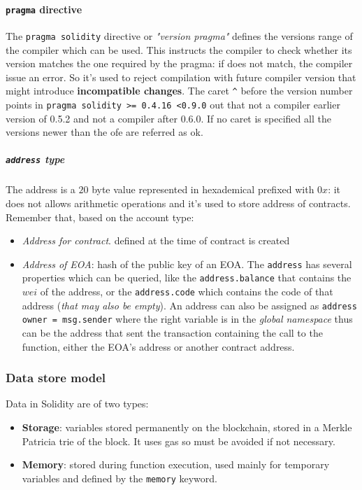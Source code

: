 \documentclass[10pt,a4paper]{report}
\begin{document}
\paragraph{\texttt{pragma} directive}\label{sec:pragma-directive}
The \texttt{pragma solidity} directive or \textit{"version pragma"} defines the versions range of the compiler which can be used. This instructs the compiler to check whether its version matches the one required by the pragma: if does not match, the compiler issue an error. So it's used to reject compilation with future compiler version that might introduce \textbf{incompatible changes}. The caret \texttt{\^} before the version number points in \texttt{pragma solidity >= 0.4.16 <0.9.0} out that not a compiler earlier version of 0.5.2 and not a compiler after 0.6.0. If no caret is specified all the versions newer than the ofe are referred as ok.
\subparagraph{\texttt{address} type}\label{sec:address-type}
The address is a $20$ byte value represented in hexademical prefixed with $0x$: it does not allows arithmetic operations and it's used to store address of contracts. Remember that, based on the account type:
\begin{itemize}
	\item 
	\textit{Address for contract}. defined at the time of contract is created
	\item 
	\textit{Address of EOA}: hash of the public key of an EOA.
	The \texttt{address} has several properties which can be queried, like the \texttt{address.balance} that contains the $wei$ of the address, or the \texttt{address.code} which contains the code of that address  (\textit{that may also be empty}).
	An address can also be assigned as \texttt{address owner = msg.sender} where the right variable is in the \textit{global namespace} thus can be the address that sent the transaction containing the call to the function, either the EOA's address or another contract address.
\end{itemize}
\subsubsection{Data store model}\label{sec:data-store-model}
Data in Solidity are of two types:
\begin{itemize}
	\item 
	\textbf{Storage}: variables stored permanently on the blockchain, stored in a Merkle Patricia trie of the block. It uses gas so must be avoided if not necessary.
	\item 
	\textbf{Memory}: stored during function execution, used mainly for temporary variables and defined by the \texttt{memory} keyword.
\end{itemize}
\end{document}
